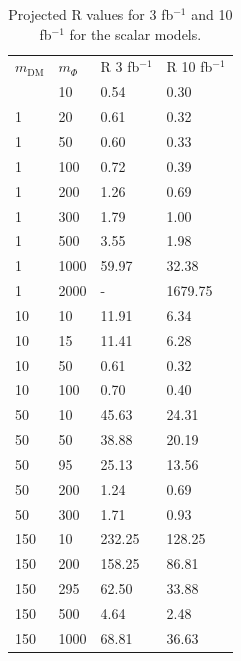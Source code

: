 \begin{table}[h!]
  \centering
  \begin{tabular}{llll}
    \hline                      
    $m_\textrm{DM}$ & $m_\Phi$  & R 3 fb$^{-1}$ & R 10 fb$^{-1}$ \\ \hlin
    1	& 10	& 0.54	& 0.30 \\ \hline
    1	& 20	& 0.61	& 0.32 \\ \hline
    1	& 50	& 0.60	& 0.33 \\ \hline
    1	& 100	& 0.72	& 0.39 \\ \hline
    1	& 200	& 1.26	& 0.69 \\ \hline
    1	& 300	& 1.79	& 1.00 \\ \hline
    1	& 500	& 3.55	& 1.98 \\ \hline
    1	& 1000	& 59.97	& 32.38 \\ \hline
    1	& 2000	& -    & 1679.75 \\ \hline
    10	& 10	& 11.91	& 6.34 \\ \hline 
    10	& 15	& 11.41	& 6.28 \\ \hline
    10	& 50	& 0.61	& 0.32 \\ \hline
    10	& 100	& 0.70	& 0.40 \\ \hline
    50	& 10	& 45.63	& 24.31 \\ \hline
    50	& 50	& 38.88	& 20.19 \\ \hline
    50	& 95	& 25.13	& 13.56 \\ \hline
    50	& 200	& 1.24	& 0.69 \\ \hline
    50	& 300	& 1.71	& 0.93 \\ \hline
    150	& 10	& 232.25& 128.25 \\ \hline
    150	& 200	& 158.25& 86.81 \\ \hline
    150	& 295	& 62.50	& 33.88 \\ \hline
    150	& 500	& 4.64	& 2.48 \\ \hline
    150	& 1000	& 68.81	& 36.63 \\ \hline
  \end{tabular}
  \caption{Projected R values for 3 fb$^{-1}$ and 10 fb$^{-1}$ for the scalar models. \label{tab:dm_S_R_values}}
\end{table}


